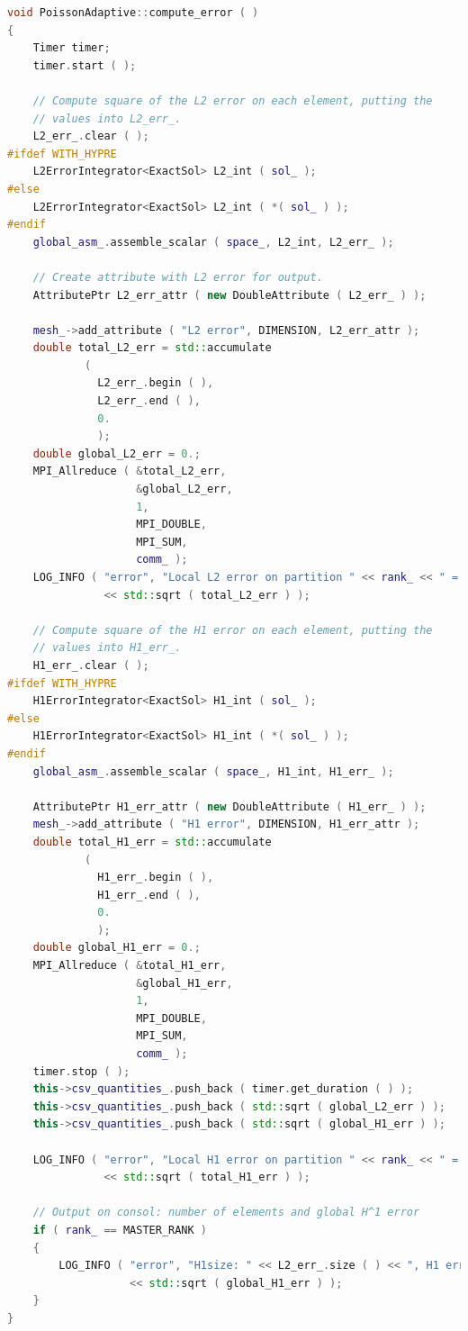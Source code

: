\documentclass[a4paper, 11pt, twoside]{article}
\begin{document}
\begin{lstlisting}[language=C++, basicstyle={\footnotesize, \ttfamily}, keywordstyle=\color{blue}, numbers=none, tabsize=4]
void PoissonAdaptive::compute_error ( )
{
    Timer timer;
    timer.start ( );

    // Compute square of the L2 error on each element, putting the
    // values into L2_err_.
    L2_err_.clear ( );
#ifdef WITH_HYPRE
    L2ErrorIntegrator<ExactSol> L2_int ( sol_ );
#else
    L2ErrorIntegrator<ExactSol> L2_int ( *( sol_ ) );
#endif
    global_asm_.assemble_scalar ( space_, L2_int, L2_err_ );

    // Create attribute with L2 error for output.
    AttributePtr L2_err_attr ( new DoubleAttribute ( L2_err_ ) );

    mesh_->add_attribute ( "L2 error", DIMENSION, L2_err_attr );
    double total_L2_err = std::accumulate
            (
              L2_err_.begin ( ),
              L2_err_.end ( ),
              0.
              );
    double global_L2_err = 0.;
    MPI_Allreduce ( &total_L2_err,
                    &global_L2_err,
                    1,
                    MPI_DOUBLE,
                    MPI_SUM,
                    comm_ );
    LOG_INFO ( "error", "Local L2 error on partition " << rank_ << " = " 
               << std::sqrt ( total_L2_err ) );

    // Compute square of the H1 error on each element, putting the
    // values into H1_err_.
    H1_err_.clear ( );
#ifdef WITH_HYPRE
    H1ErrorIntegrator<ExactSol> H1_int ( sol_ );
#else
    H1ErrorIntegrator<ExactSol> H1_int ( *( sol_ ) );
#endif
    global_asm_.assemble_scalar ( space_, H1_int, H1_err_ );

    AttributePtr H1_err_attr ( new DoubleAttribute ( H1_err_ ) );
    mesh_->add_attribute ( "H1 error", DIMENSION, H1_err_attr );
    double total_H1_err = std::accumulate
            (
              H1_err_.begin ( ),
              H1_err_.end ( ),
              0.
              );
    double global_H1_err = 0.;
    MPI_Allreduce ( &total_H1_err,
                    &global_H1_err,
                    1,
                    MPI_DOUBLE,
                    MPI_SUM,
                    comm_ );
    timer.stop ( );
    this->csv_quantities_.push_back ( timer.get_duration ( ) );
    this->csv_quantities_.push_back ( std::sqrt ( global_L2_err ) );
    this->csv_quantities_.push_back ( std::sqrt ( global_H1_err ) );

    LOG_INFO ( "error", "Local H1 error on partition " << rank_ << " = " 
               << std::sqrt ( total_H1_err ) );

    // Output on consol: number of elements and global H^1 error
    if ( rank_ == MASTER_RANK )
    {
        LOG_INFO ( "error", "H1size: " << L2_err_.size ( ) << ", H1 error: "
                   << std::sqrt ( global_H1_err ) );
    }
}
\end{lstlisting}
\end{document}
